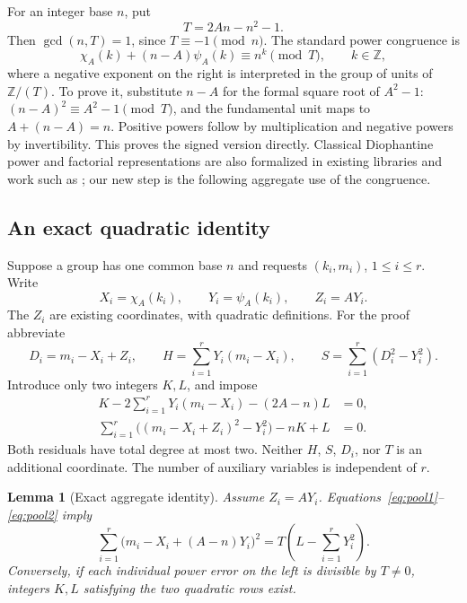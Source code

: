 \documentclass[11pt,letterpaper]{article}
\newtheorem{lemma}[theorem]{Lemma}
\theoremstyle{definition}\newtheorem{definition}[theorem]{Definition}
\theoremstyle{remark}\newtheorem{remark}[theorem]{Remark}
\newcommand{\Z}{\mathbb Z}\newcommand{\N}{\mathbb N}
\begin{document}
For an integer base \(n\), put
\begin{equation}\label{eq:modulus}
T=2An-n^2-1.
\end{equation}
Then \(\gcd(n,T)=1\), since \(T\equiv-1\pmod n\). The standard power
congruence is
\begin{equation}\label{eq:pellpower}
\chi_A(k)+(n-A)\psi_A(k)\equiv n^k\pmod T,
\qquad k\in\Z,
\end{equation}
where a negative exponent on the right is interpreted in the group of
units of \(\Z/(T)\). To prove it, substitute \(n-A\) for the formal
square root of \(A^2-1\):
\((n-A)^2\equiv A^2-1\pmod T\), and the fundamental unit maps to
\(A+(n-A)=n\). Positive powers follow by multiplication and negative
powers by invertibility. This proves the signed version directly.
Classical Diophantine power and factorial representations are also
formalized in existing libraries and work such as \cite{pak}; our new
step is the following aggregate use of the congruence.

\subsection{An exact quadratic identity}

Suppose a group has one common base \(n\) and requests
\((k_i,m_i)\), \(1\le i\le r\). Write
\[
X_i=\chi_A(k_i),\qquad Y_i=\psi_A(k_i),\qquad Z_i=AY_i.
\]
The \(Z_i\) are existing coordinates, with quadratic definitions.
For the proof abbreviate
\[
D_i=m_i-X_i+Z_i,\qquad
H=\sum_{i=1}^rY_i(m_i-X_i),\qquad
S=\sum_{i=1}^r(D_i^2-Y_i^2).
\]
Introduce only two integers \(K,L\), and impose
\begin{align}
K-2\sum_{i=1}^rY_i(m_i-X_i)-(2A-n)L&=0,
                                                        \label{eq:pool1}\\
\sum_{i=1}^r\bigl((m_i-X_i+Z_i)^2-Y_i^2\bigr)-nK+L&=0.
                                                        \label{eq:pool2}
\end{align}
Both residuals have total degree at most two. Neither \(H\), \(S\),
\(D_i\), nor \(T\) is an additional coordinate. The number of auxiliary
variables is independent of \(r\).

\begin{lemma}[Exact aggregate identity]\label{lem:identity}
Assume \(Z_i=AY_i\). Equations~\eqref{eq:pool1}--\eqref{eq:pool2}
imply
\begin{equation}\label{eq:erroridentity}
\sum_{i=1}^r\bigl(m_i-X_i+(A-n)Y_i\bigr)^2
=T\left(L-\sum_{i=1}^rY_i^2\right).
\end{equation}
Conversely, if each individual power error on the left is divisible by
\(T\ne0\), integers \(K,L\) satisfying the two quadratic rows exist.
\end{lemma}
\end{document}
